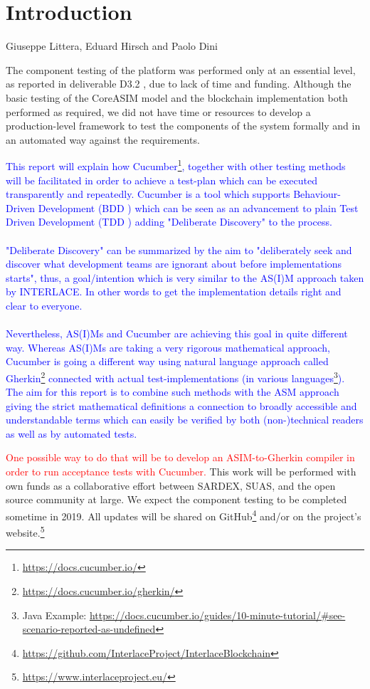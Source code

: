 \chapter{Introduction}
\label{ch:Introduction}

\vspace{-1cm}
\begin{center}
Giuseppe Littera, Eduard Hirsch and Paolo Dini
\end{center}

The component testing of the platform was performed only at an essential level, as reported in deliverable D3.2 \cite{INTERLACE_D32}, due to lack of time and funding. Although the basic testing of the CoreASIM model and the blockchain implementation both performed as required, we did not have time or resources to develop a production-level framework to test the components of the system formally and in an automated way against the requirements.

\textcolor{blue}{This report will explain how Cucumber\footnote{\url{https://docs.cucumber.io/}}, together with other testing methods will be facilitated in order to achieve a test-plan which can be executed transparently and repeatedly. Cucumber is a tool which supports Behaviour-Driven Development (BDD \cite{wynne2017cucumber}) which can be seen as an advancement to plain Test Driven Development (TDD \cite{beck2003test}) adding "Deliberate Discovery" to the process.\\\\
"Deliberate Discovery" \cite{wynne2017cucumber} can be summarized by the aim to "deliberately seek and discover what development teams are ignorant about before implementations starts", thus, a goal/intention which is very similar to the AS(I)M approach taken by INTERLACE. In other words to get the implementation details right and clear to everyone.\\\\
Nevertheless, AS(I)Ms and Cucumber are achieving this goal in quite different way. Whereas AS(I)Ms are taking a very rigorous mathematical approach, Cucumber is going a different way using natural language approach called Gherkin\footnote{\url{https://docs.cucumber.io/gherkin/}} connected with actual test-implementations (in various languages\footnote{Java Example: \url{https://docs.cucumber.io/guides/10-minute-tutorial/\#see-scenario-reported-as-undefined}}). The aim for this report is to combine such methods with the ASM approach giving the strict mathematical definitions a connection to broadly accessible and understandable terms which can easily be verified by both (non-)technical readers as well as by automated tests.
}

\textcolor{red}{One possible way to do that will be to develop an ASIM-to-Gherkin compiler in order to run acceptance tests with Cucumber.}  This work will be performed with own funds as a collaborative effort between SARDEX, SUAS, and the open source community at large. We expect the component testing to be completed sometime in 2019. All updates will be shared on GitHub\footnote{\url{https://github.com/InterlaceProject/InterlaceBlockchain}} and/or on the project's website.\footnote{\url{https://www.interlaceproject.eu/}} 

\newpage
